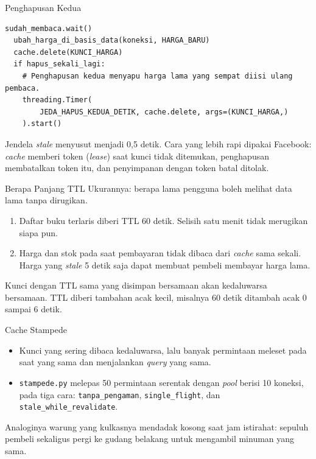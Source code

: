 \documentclass[aspectratio=169, table, 12pt]{beamer}
\begin{document}
\begin{frame}[fragile]{{\Large Penghapusan Kedua}}
  \vspace{4pt}
\begin{lstlisting}[style=PythonStyle]
  sudah_membaca.wait()
  ubah_harga_di_basis_data(koneksi, HARGA_BARU)
  cache.delete(KUNCI_HARGA)
  if hapus_sekali_lagi:
    # Penghapusan kedua menyapu harga lama yang sempat diisi ulang pembaca.
    threading.Timer(
        JEDA_HAPUS_KEDUA_DETIK, cache.delete, args=(KUNCI_HARGA,)
    ).start()
\end{lstlisting}

  \vspace{4pt}
  {\footnotesize Jendela \textit{stale} menyusut menjadi 0,5 detik. Cara yang lebih rapi
  dipakai Facebook: \textit{cache} memberi token (\textit{lease}) saat kunci
  tidak ditemukan, penghapusan membatalkan token itu, dan penyimpanan dengan
  token batal ditolak.}
\end{frame}

\begin{frame}{{\Large Berapa Panjang TTL}}
  \vspace{8pt}
  Ukurannya: berapa lama pengguna boleh melihat data lama tanpa dirugikan.
  \vspace{4pt}
  \begin{enumerate}
    \item Daftar buku terlaris diberi TTL 60 detik. Selisih satu menit tidak
          merugikan siapa pun.
    \item Harga dan stok pada saat pembayaran tidak dibaca dari
          \textit{cache} sama sekali. Harga yang \textit{stale} 5 detik saja dapat
          membuat pembeli membayar harga lama.
  \end{enumerate}
  \vspace{6pt}
  {\footnotesize Kunci dengan TTL sama yang disimpan bersamaan akan kedaluwarsa
  bersamaan. TTL diberi tambahan acak kecil, misalnya 60 detik ditambah acak 0
  sampai 6 detik.}
\end{frame}

\begin{frame}{{\Large Cache Stampede}}
  \vspace{10pt}
  \begin{itemize}
    \item Kunci yang sering dibaca kedaluwarsa, lalu banyak permintaan meleset
          pada saat yang sama dan menjalankan \textit{query} yang sama.
    \item \texttt{stampede.py} melepas 50 permintaan serentak dengan
          \textit{pool} berisi 10 koneksi, pada tiga cara:
          \texttt{tanpa\_pengaman}, \texttt{single\_flight}, dan
          \texttt{stale\_while\_revalidate}.
  \end{itemize}
  \vspace{8pt}
  {\footnotesize Analoginya warung yang kulkasnya mendadak kosong saat jam
  istirahat: sepuluh pembeli sekaligus pergi ke gudang belakang untuk
  mengambil minuman yang sama.}
\end{frame}
\end{document}
